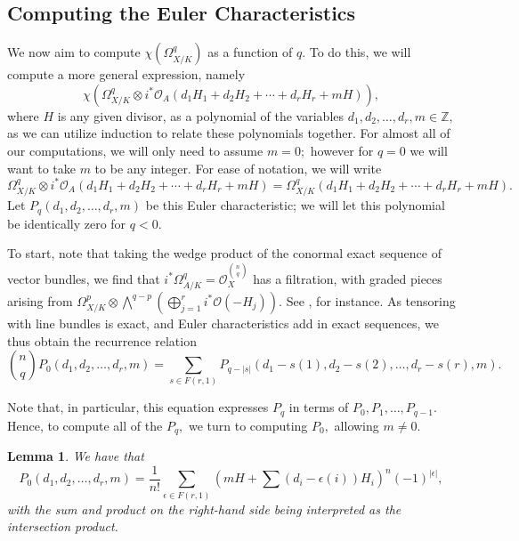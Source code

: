 \documentclass{article}
\newtheorem{lemma}[thm]{Lemma}
\theoremstyle{definition}
\theoremstyle{remark}
\begin{document}
\subsection{Computing the Euler Characteristics}
We now aim to compute $\chi(\Omega^q_{X/K})$ as a function of $q.$ To do this, we will compute a more general expression, namely $$\chi(\Omega^q_{X/K} \otimes i^*\mathcal{O}_A(d_1H_1 + d_2H_2 + \cdots + d_rH_r + mH)),$$ where $H$ is any given divisor, as a polynomial of the variables $d_1, d_2, \ldots, d_r, m \in \mathbb{Z},$ as we can utilize induction to relate these polynomials together. For almost all of our computations, we will only need to assume $m = 0;$ however for $q = 0$ we will want to take $m$ to be any integer. For ease of notation, we will write \[\Omega^q_{X/K} \otimes i^*\mathcal{O}_A(d_1H_1 + d_2H_2 + \cdots + d_rH_r + mH) = \Omega^q_{X/K}(d_1H_1 + d_2H_2 + \cdots + d_rH_r + mH).\] Let $P_q(d_1, d_2, \ldots, d_r, m)$ be this Euler characteristic; we will let this polynomial be identically zero for $q < 0.$
\par To start, note that taking the wedge product of the conormal exact sequence of vector bundles, we find that $i^*\Omega^q_{A/K} = \mathcal{O}_X^{\binom{n}{q}}$ has a filtration, with graded pieces arising from $\Omega^p_{X/K} \otimes \bigwedge^{q-p} (\bigoplus\limits_{j=1}^r i^*\mathcal{O}(-H_j)).$ See \cite[Exercise 14.2.N]{vakil}, for instance. As tensoring with line bundles is exact, and Euler characteristics add in exact sequences, we thus obtain the recurrence relation \[\binom{n}{q} P_0(d_1, d_2, \ldots, d_r, m) = \sum\limits_{s \in F(r, 1) } P_{q - |s|}(d_1 - s(1), d_2 - s(2), \ldots, d_r - s(r), m).\]
\par Note that, in particular, this equation expresses $P_q$ in terms of $P_0, P_1, \ldots, P_{q-1}.$ Hence, to compute all of the $P_q,$ we turn to computing $P_0,$ allowing $m \neq 0.$
\begin{lemma}\label{lem: zeroth wedge characteristic}
We have that \[P_0(d_1, d_2, \ldots, d_r, m) = \frac{1}{n!} \sum\limits_{\epsilon \in F(r, 1)} \left(mH + \sum (d_i - \epsilon(i)) H_i\right)^n (-1)^{|\epsilon|},\] with the sum and product on the right-hand side being interpreted as the intersection product.
\end{lemma}
\end{document}

